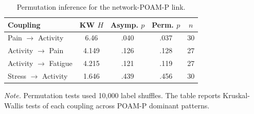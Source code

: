 \begin{table}[H]
\raggedright
\caption{Permutation inference for the network-POAM-P link.}
\label{tab:permutation}
\footnotesize
\begingroup
\setlength{\tabcolsep}{4pt}
\renewcommand{\arraystretch}{1.08}
\noindent
\begin{tabular*}{\textwidth}{@{\extracolsep{\fill}}lcccc@{}}
\toprule
Coupling & KW $H$ & Asymp. $p$ & Perm. $p$ & $n$ \\
\midrule
Pain $\rightarrow$ Activity & 6.46 & .040 & .037 & 30 \\
Activity $\rightarrow$ Pain & 4.149 & .126 & .128 & 27 \\
Activity $\rightarrow$ Fatigue & 4.215 & .121 & .119 & 27 \\
Stress $\rightarrow$ Activity & 1.646 & .439 & .456 & 30 \\
\bottomrule
\end{tabular*}
\par\vspace{3pt}\noindent\parbox{\textwidth}{\footnotesize\textit{Note.} Permutation tests used 10,000 label shuffles. The table reports Kruskal-Wallis tests of each coupling across POAM-P dominant patterns.}
\endgroup
\end{table}
